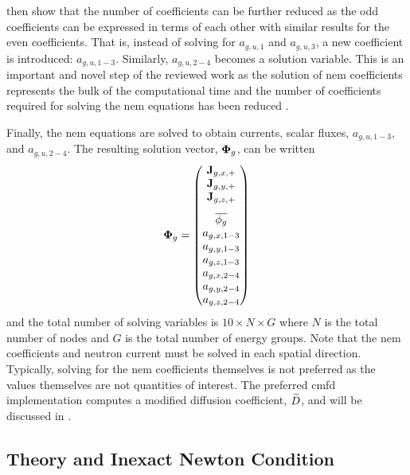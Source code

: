     \citeauthor{qe2paper} then show that the number of coefficients can be
    further reduced as the odd coefficients can be expressed in terms of
    each other with similar results for the even coefficients. That is,
    instead of solving for $a_{g,u,1}$ and $a_{g,u,3}$, a new coefficient is
    introduced: $a_{g,u,1-3}$. Similarly, $a_{g,u,2-4}$ becomes a solution
    variable. This is an important and novel step of the reviewed work as the
    solution of \gls{nem} coefficients represents the bulk of the
    computational time and the number of coefficients required for solving the
    \gls{nem} equations has been reduced \cite{qe2paper}.

    Finally, the \gls{nem} equations are solved to obtain currents, scalar
    fluxes, $a_{g,u,1-3}$, and $a_{g,u,2-4}$. The resulting solution vector,
    $\mathbf{\Phi}_g$, can be written 
    \begin{equation}
      \label{eq:solution_vector}
      \vPhi_g =
      \begin{pmatrix}
        \current_{g,x,+} \\
        \current_{g,y,+} \\
        \vspace{8pt}
        \current_{g,z,+} \\
        \overline{\phi_g} \\
        a_{g,x,1-3} \\
        a_{g,y,1-3} \\
        a_{g,z,1-3} \\
        a_{g,x,2-4} \\
        a_{g,y,2-4} \\
        a_{g,z,2-4}
      \end{pmatrix}
    \end{equation}
    and the total number of solving variables is $10 \times N \times G$ where
    $N$ is the total number of nodes and $G$ is the total number of energy
    groups. Note that the \gls{nem} coefficients and neutron current must be
    solved in each spatial direction. Typically, solving for the \gls{nem}
    coefficients themselves is not preferred as the values themselves are not
    quantities of interest.  The preferred \gls{cmfd} implementation computes
    a modified diffusion coefficient, $\widetilde{D}$, and will be discussed in
    .

  \subsection{ Theory and Inexact Newton Condition}
    \label{sec:jfnk_theory}

